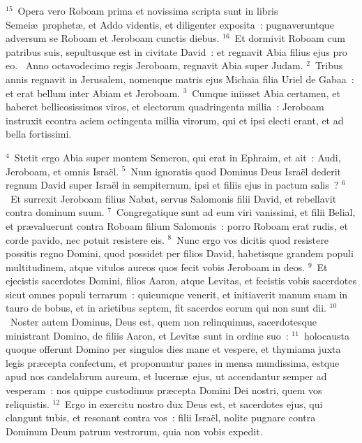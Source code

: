 ${}^{15}$~Opera vero Roboam prima et novissima scripta sunt in libris Semei\ae\ prophet\ae , et Addo videntis, et diligenter exposita~: pugnaveruntque adversum se Roboam et Jeroboam cunctis diebus.
${}^{16}$~Et dormivit Roboam cum patribus suis, sepultusque est in civitate David~: et regnavit Abia filius ejus pro eo.
~\lettrine[lines=10,image=true,loversize=0.05,lraise=-0.03]{A}{}nno octavodecimo regis Jeroboam, regnavit Abia super Judam.
${}^{2}$~Tribus annis regnavit in Jerusalem, nomenque matris ejus Michaia filia Uriel de Gabaa~: et erat bellum inter Abiam et Jeroboam.
${}^{3}$~Cumque iniisset Abia certamen, et haberet bellicosissimos viros, et electorum quadringenta millia~: Jeroboam instruxit econtra aciem octingenta millia virorum, qui et ipsi electi erant, et ad bella fortissimi.


${}^{4}$~Stetit ergo Abia super montem Semeron, qui erat in Ephraim, et ait~: Audi, Jeroboam, et omnis Isra\"el.
${}^{5}$~Num ignoratis quod Dominus Deus Isra\"el dederit regnum David super Isra\"el in sempiternum, ipsi et filiis ejus in pactum salis~?
${}^{6}$~Et surrexit Jeroboam filius Nabat, servus Salomonis filii David, et rebellavit contra dominum suum.
${}^{7}$~Congregatique sunt ad eum viri vanissimi, et filii Belial, et pr\ae valuerunt contra Roboam filium Salomonis~: porro Roboam erat rudis, et corde pavido, nec potuit resistere eis.
${}^{8}$~Nunc ergo vos dicitis quod resistere possitis regno Domini, quod possidet per filios David, habetisque grandem populi multitudinem, atque vitulos aureos quos fecit vobis Jeroboam in deos.
${}^{9}$~Et ejecistis sacerdotes Domini, filios Aaron, atque Levitas, et fecistis vobis sacerdotes sicut omnes populi terrarum~: quicumque venerit, et initiaverit manum suam in tauro de bobus, et in arietibus septem, fit sacerdos eorum qui non sunt dii.
${}^{10}$~Noster autem Dominus, Deus est, quem non relinquimus, sacerdotesque ministrant Domino, de filiis Aaron, et Levit\ae\ sunt in ordine suo~:
${}^{11}$~holocausta quoque offerunt Domino per singulos dies mane et vespere, et thymiama juxta legis pr\ae cepta confectum, et proponuntur panes in mensa mundissima, estque apud nos candelabrum aureum, et lucern\ae\ ejus, ut accendantur semper ad vesperam~: nos quippe custodimus pr\ae cepta Domini Dei nostri, quem vos reliquistis.
${}^{12}$~Ergo in exercitu nostro dux Deus est, et sacerdotes ejus, qui clangunt tubis, et resonant contra vos~: filii Isra\"el, nolite pugnare contra Dominum Deum patrum vestrorum, quia non vobis expedit.


